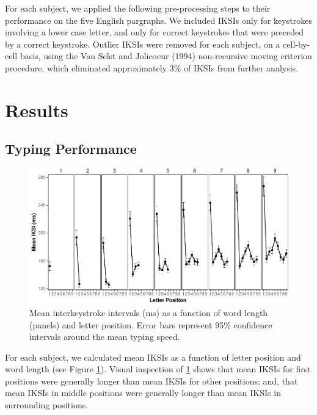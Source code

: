 \documentclass[,man,floatsintext]{apa6}
\begin{document}
For each subject, we applied the following pre-processing steps to their performance on the five English pargraphs. We included IKSIs only for keystrokes involving a lower case letter, and only for correct keystrokes that were preceded by a correct keystroke. Outlier IKSIs were removed for each subject, on a cell-by-cell basis, using the Van Selst and Jolicoeur (1994) non-recursive moving criterion procedure, which eliminated approximately 3\% of IKSIs from further analysis.

\hypertarget{results}{%
\section{Results}\label{results}}

\hypertarget{typing-performance}{%
\subsection{Typing Performance}\label{typing-performance}}

\begin{figure}
\centering
\includegraphics{v2-manuscript_files/figure-latex/figure1-1.pdf}
\caption{\label{fig:figure1}Mean interkeystroke intervals (ms) as a function of word length (panels) and letter position. Error bars represent 95\% confidence intervals around the mean typing speed.}
\end{figure}



For each subject, we calculated mean IKSIs as a function of letter position and word length (see Figure \ref{fig:figure1}). Visual inspection of \ref{fig:figure1} shows that mean IKSIs for first positions were generally longer than mean IKSIs for other positions; and, that mean IKSIs in middle positions were generally longer than mean IKSIs in surrounding positions.
\end{document}
